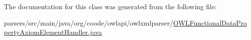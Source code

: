 The documentation for this class was generated from the following file\-:\begin{DoxyCompactItemize}
\item 
parsers/src/main/java/org/coode/owlapi/owlxmlparser/\hyperlink{_o_w_l_functional_data_property_axiom_element_handler_8java}{O\-W\-L\-Functional\-Data\-Property\-Axiom\-Element\-Handler.\-java}\end{DoxyCompactItemize}
